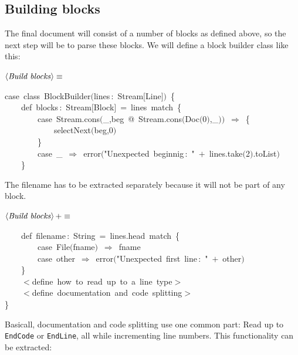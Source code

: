\documentclass[a4paper,12pt]{article}
\begin{document}
\subsection{Building blocks}
The final document will consist of a number of blocks as defined above,
so the next step will be to parse these blocks. We will define a
block builder class like this:

$\left<\mbox{\emph{Build blocks}}\right>\equiv$
\begin{program}{\vem case}~{\vem class}~BlockBuilder$($lines\,{\rm :}~Stream$[$Line$]$$)$~{\small\{}
\\~~~~{\vem def}~blocks\,{\rm :}~Stream$[$Block$]$~=~lines~{\vem match}~{\small\{}
\\~~~~~~~~{\vem case}~Stream.cons$($\_,beg~@~Stream.cons$($Doc$($0$)$,\_$)$$)$~$\Rightarrow$~{\small\{}
\\~~~~~~~~~~~~selectNext$($beg,0$)$
\\~~~~~~~~{\small\}}
\\~~~~~~~~{\vem case}~\_~$\Rightarrow$~error$($"Unexpected~beginnig\,{\rm :}~"~$+$~lines.take$($2$)$.toList$)$
\\~~~~{\small\}}
\\[0.5em]\end{program}



The filename has to be extracted separately because it will not
be part of any block.

$\left<\mbox{\emph{Build blocks}}\right>+\equiv$
\begin{program}~~~~{\vem def}~filename\,{\rm :}~String~=~lines.head~{\vem match}~{\small\{}
\\~~~~~~~~{\vem case}~File$($fname$)$~$\Rightarrow$~fname
\\~~~~~~~~{\vem case}~other~$\Rightarrow$~error$($"Unexpected~first~line\,{\rm :}~"~$+$~other$)$
\\~~~~{\small\}}
\\[0.5em]~~~~$<$define~how~to~read~up~to~a~line~{\vem type}$>$
\\~~~~$<$define~documentation~and~code~splitting$>$
\\{\small\}}
\\[0.5em]\end{program}



Basicall, documentation and code splitting use one common part:
Read up to \texttt{EndCode} or \texttt{EndLine}, all while incrementing line
numbers. This functionality can be extracted:
\end{document}
